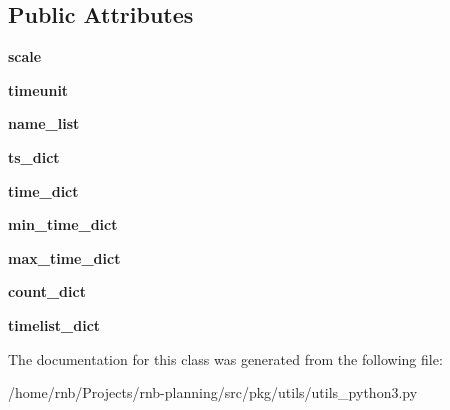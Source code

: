 \subsection*{Public Attributes}
\begin{DoxyCompactItemize}
\item 
\mbox{\label{classrnb-planning_1_1src_1_1pkg_1_1utils_1_1utils__python3_1_1_global_timer_a4f6a8a3fa0f9b2e31e3b1055d60afb4d}} 
{\bfseries scale}
\item 
\mbox{\label{classrnb-planning_1_1src_1_1pkg_1_1utils_1_1utils__python3_1_1_global_timer_af40f7c1aeea5c43d800028ba79819d70}} 
{\bfseries timeunit}
\item 
\mbox{\label{classrnb-planning_1_1src_1_1pkg_1_1utils_1_1utils__python3_1_1_global_timer_a430bc0959a9a9a6ff9e13a1a423c6fda}} 
{\bfseries name\+\_\+list}
\item 
\mbox{\label{classrnb-planning_1_1src_1_1pkg_1_1utils_1_1utils__python3_1_1_global_timer_a87d86cd0930b5243b00adfd9d4e30a11}} 
{\bfseries ts\+\_\+dict}
\item 
\mbox{\label{classrnb-planning_1_1src_1_1pkg_1_1utils_1_1utils__python3_1_1_global_timer_ad6437ef69767faf2aab38f0c9018226d}} 
{\bfseries time\+\_\+dict}
\item 
\mbox{\label{classrnb-planning_1_1src_1_1pkg_1_1utils_1_1utils__python3_1_1_global_timer_a67e7f2ee1e237c26ad7a08adbc37ab19}} 
{\bfseries min\+\_\+time\+\_\+dict}
\item 
\mbox{\label{classrnb-planning_1_1src_1_1pkg_1_1utils_1_1utils__python3_1_1_global_timer_a909f59b75b1b09b6903a6afdce2181ec}} 
{\bfseries max\+\_\+time\+\_\+dict}
\item 
\mbox{\label{classrnb-planning_1_1src_1_1pkg_1_1utils_1_1utils__python3_1_1_global_timer_a0e5c7a0e43d7f758e4e1e8c4af163a42}} 
{\bfseries count\+\_\+dict}
\item 
\mbox{\label{classrnb-planning_1_1src_1_1pkg_1_1utils_1_1utils__python3_1_1_global_timer_a35687c24674794c7c6a8a79ae6ae7fce}} 
{\bfseries timelist\+\_\+dict}
\end{DoxyCompactItemize}


The documentation for this class was generated from the following file\+:\begin{DoxyCompactItemize}
\item 
/home/rnb/\+Projects/rnb-\/planning/src/pkg/utils/utils\+\_\+python3.\+py\end{DoxyCompactItemize}
